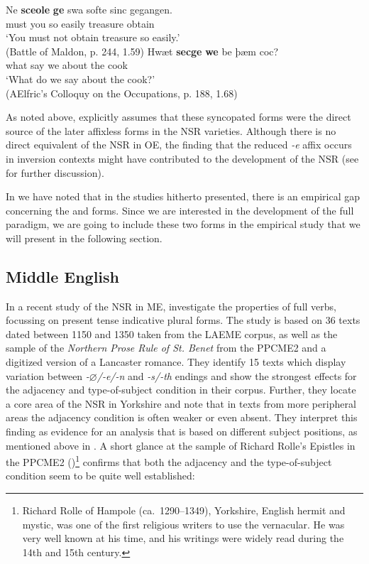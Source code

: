 \documentclass[output=paper]{langsci/langscibook}
\begin{document}
\ea
\ea\label{exwege2}
\gll Ne \textbf{sceole} \textbf{ge} swa softe sinc gegangen.\\
\Neg{} must you so easily treasure obtain\\
\glt `You must not obtain treasure so easily.'\\
(Battle of Maldon, p. 244, 1.59)
\ex
\gll Hwæt \textbf{secge} \textbf{we} be  þæm coc?\\
what say we about the cook\\
\glt `What do we say about the cook?'\\
(AElfric's Colloquy on the Occupations, p. 188, 1.68)
\z
\z

As noted above, \citet{Rodeffer:1903} explicitly assumes that these syncopated
forms were the direct source of the later affixless forms in the \gls{NSR}
varieties. Although there is no direct equivalent of the \gls{NSR} in \gls{OE},
the finding that the reduced \emph{-e} affix occurs in inversion contexts might
have contributed to the development of the \gls{NSR} (see
 for further discussion).

In  we have noted that in the studies hitherto presented, there
is an empirical gap concerning the \Fsg{} and \Ssg{} forms.  Since we are
interested in the development of the full paradigm, we are going to include
these two forms in the empirical study that we will present in the following
section.

\subsection{Middle English}
\label{sec:me}

In a recent study of the \gls{NSR} in ME, \cite{deHaasandvanKemenade:2015}
investigate the  properties of full verbs, focussing on present tense
indicative plural forms. The study is based on 36 texts dated between 1150 and
1350 taken from the \nocite{LAEME} LAEME corpus, as well as the sample of the
\emph{Northern Prose Rule of St. Benet} from the PPCME2 and a digitized version
of a Lancaster romance. They identify 15 texts which display variation between
\emph{-$\varnothing$/-e/-n} and \emph{-s/-th} endings and show the strongest effects for
the adjacency and type-of-subject condition in their corpus. Further, they
locate a core area of the \gls{NSR} in Yorkshire and note that in texts from
more peripheral areas the adjacency condition is often weaker or even absent.
They interpret this finding as evidence for an analysis that is based on
different subject positions, as mentioned above in . A
short glance at the sample of Richard Rolle's Epistles in the PPCME2
(\citealt{KroTay2000})\footnote{Richard Rolle of Hampole (ca.\ 1290--1349),
    Yorkshire, English hermit and mystic, was one of the first religious writers to
    use the vernacular. He was very well known at his time, and his writings were
widely read during the 14th and 15th century.} confirms that both the adjacency
and the type-of-subject condition seem to be quite well established:
\end{document}
